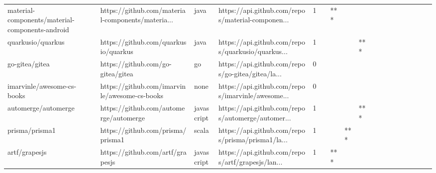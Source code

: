 \begin{tabular}{llllrlllllllllllll}
material-components/material-components-android    &  https://github.com/material-components/materia... &              java &  https://api.github.com/repos/material-componen... &       1 &         &    *** &           &                &                 &        &           &           &          &          &       &              &          \\
quarkusio/quarkus                                  &               https://github.com/quarkusio/quarkus &              java &  https://api.github.com/repos/quarkusio/quarkus... &       1 &         &        &           &            *** &                 &        &           &           &          &          &       &              &          \\
go-gitea/gitea                                     &                  https://github.com/go-gitea/gitea &                go &  https://api.github.com/repos/go-gitea/gitea/la... &       0 &         &        &           &                &                 &        &           &           &          &          &       &              &          \\
imarvinle/awesome-cs-books                         &      https://github.com/imarvinle/awesome-cs-books &              none &  https://api.github.com/repos/imarvinle/awesome... &       0 &         &        &           &                &                 &        &           &           &          &          &       &              &          \\
automerge/automerge                                &             https://github.com/automerge/automerge &        javascript &  https://api.github.com/repos/automerge/automer... &       1 &         &        &           &            *** &                 &        &           &           &          &          &       &              &          \\
prisma/prisma1                                     &                  https://github.com/prisma/prisma1 &             scala &  https://api.github.com/repos/prisma/prisma1/la... &       1 &         &        &       *** &                &                 &        &           &           &          &          &       &              &          \\
artf/grapesjs                                      &                   https://github.com/artf/grapesjs &        javascript &  https://api.github.com/repos/artf/grapesjs/lan... &       1 &         &    *** &           &                &                 &        &           &           &          &          &       &              &          \\

\end{tabular}
